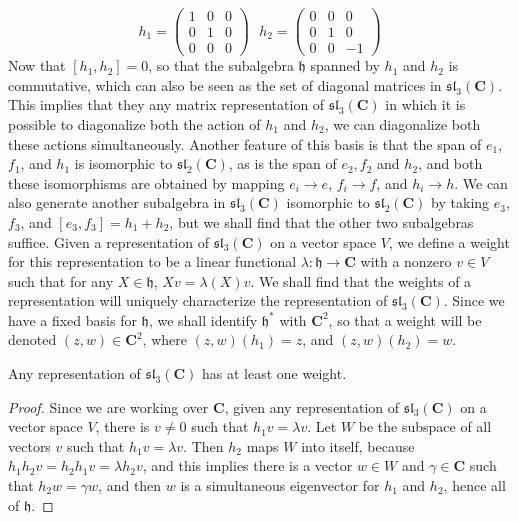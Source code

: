 \[ h_1 = \begin{pmatrix} 1 & 0 & 0 \\ 0 & 1 & 0 \\ 0 & 0 & 0 \end{pmatrix}\ \ \ h_2 = \begin{pmatrix} 0 & 0 & 0 \\ 0 & 1 & 0 \\ 0 & 0 & -1 \end{pmatrix} \]
%
Now that $[h_1, h_2] = 0$, so that the subalgebra $\mathfrak{h}$ spanned by $h_1$ and $h_2$ is commutative, which can also be seen as the set of diagonal matrices in $\mathfrak{sl}_3(\mathbf{C})$. This implies that they any matrix representation of $\mathfrak{sl}_3(\mathbf{C})$ in which it is possible to diagonalize both the action of $h_1$ and $h_2$, we can diagonalize both these actions simultaneously. Another feature of this basis is that the span of $e_1$, $f_1$, and $h_1$ is isomorphic to $\mathfrak{sl}_2(\mathbf{C})$, as is the span of $e_2, f_2$ and $h_2$, and both these isomorphisms are obtained by mapping $e_i \to e$, $f_i \to f$, and $h_i \to h$. We can also generate another subalgebra in $\mathfrak{sl}_3(\mathbf{C})$ isomorphic to $\mathfrak{sl}_2(\mathbf{C})$ by taking $e_3$, $f_3$, and $[e_3,f_3] = h_1 + h_2$, but we shall find that the other two subalgebras suffice. Given a representation of $\mathfrak{sl}_3(\mathbf{C})$ on a vector space $V$, we define a weight for this representation to be a linear functional $\lambda: \mathfrak{h} \to \mathbf{C}$ with a nonzero $v \in V$ such that for any $X \in \mathfrak{h}$, $Xv = \lambda(X)v$. We shall find that the weights of a representation will uniquely characterize the representation of $\mathfrak{sl}_3(\mathbf{C})$. Since we have a fixed basis for $\mathfrak{h}$, we shall identify $\mathfrak{h}^*$ with $\mathbf{C}^2$, so that a weight will be denoted $(z,w) \in \mathbf{C}^2$, where $(z,w)(h_1) = z$, and $(z,w)(h_2) = w$.

\begin{theorem}
    Any representation of $\mathfrak{sl}_3(\mathbf{C})$ has at least one weight.
\end{theorem}
\begin{proof}
    Since we are working over $\mathbf{C}$, given any representation of $\mathfrak{sl}_3(\mathbf{C})$ on a vector space $V$, there is $v \neq 0$ such that $h_1v = \lambda v$. Let $W$ be the subspace of all vectors $v$ such that $h_1v = \lambda v$. Then $h_2$ maps $W$ into itself, because $h_1h_2v = h_2h_1v = \lambda h_2 v$, and this implies there is a vector $w \in W$ and $\gamma \in \mathbf{C}$ such that $h_2 w = \gamma w$, and then $w$ is a simultaneous eigenvector for $h_1$ and $h_2$, hence all of $\mathfrak{h}$.
\end{proof}

